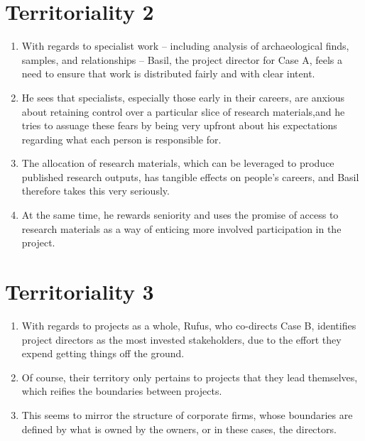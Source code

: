\documentclass[12pt]{article}
\begin{document}
\section{Territoriality 2}
\begin{enumerate}
  \item With regards to specialist work -- including analysis of archaeological finds, samples, and relationships -- Basil, the project director for Case A, feels a need to ensure that work is distributed fairly and with clear intent.
  \item He sees that specialists, especially those early in their careers, are anxious about retaining control over a particular slice of research materials,and he tries to assuage these fears by being very upfront about his expectations regarding what each person is responsible for.
  \item The allocation of research materials, which can be leveraged to produce published research outputs, has tangible effects on people's careers, and Basil therefore takes this very seriously.
  \item At the same time, he rewards seniority and uses the promise of access to research materials as a way of enticing more involved participation in the project.
\end{enumerate}
  
\section{Territoriality 3}
\begin{enumerate}
  \item With regards to projects as a whole, Rufus, who co-directs Case B, identifies project directors as the most invested stakeholders, due to the effort they expend getting things off the ground.
  \item Of course, their territory only pertains to projects that they lead themselves, which reifies the boundaries between projects.
  \item This seems to mirror the structure of corporate firms, whose boundaries are defined by what is owned by the owners, or in these cases, the directors.
\end{enumerate}
\end{document}
